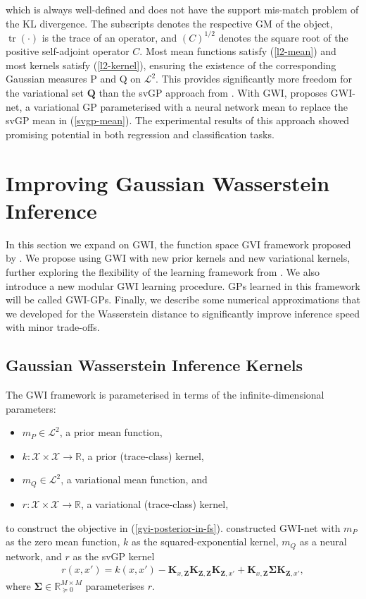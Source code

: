 \documentclass{article}
\newcommand{\tr}{\operatorname{tr}}
\numberwithin{equation}{section}
\begin{document}
which is always well-defined and does not have the support mis-match problem of the KL divergence.
The subscripts denotes the respective GM of the object, $\tr(\cdot)$ is the trace of an operator, and $(C)^{1/2}$ denotes the square root of the positive self-adjoint operator $C$.
Most mean functions satisfy (\ref{l2-mean}) and most kernels satisfy (\ref{l2-kernel}), ensuring the existence of the corresponding Gaussian measures P and Q on $\mathcal{L}^2$.
This provides significantly more freedom for the variational set $\boldsymbol{Q}$ than the svGP approach from \cite{titsias2009variational}.
With GWI, \cite{wild2022generalized} proposes GWI-net, a variational GP parameterised with a neural network mean to replace the svGP mean in (\ref{svgp-mean}).
The experimental results of this approach showed promising potential in both regression and classification tasks.

\newpage

\section{Improving Gaussian Wasserstein Inference}
In this section we expand on GWI, the function space GVI framework proposed by \cite{wild2022generalized}.
We propose using GWI with new prior kernels and new variational kernels, further exploring the flexibility of the learning framework from \cite{wild2022generalized}.
We also introduce a new modular GWI learning procedure.
GPs learned in this framework will be called GWI-GPs.
Finally, we describe some numerical approximations that we developed for the Wasserstein distance to significantly improve inference speed with minor trade-offs.

\subsection{Gaussian Wasserstein Inference Kernels}
The GWI framework is parameterised in terms of the infinite-dimensional parameters:
\begin{itemize}
    \item $m_P \in \mathcal{L}^2$, a prior mean function,
    \item $k: \mathcal{X} \times \mathcal{X} \rightarrow \mathbb{R}$, a prior (trace-class) kernel,
    \item $m_Q \in \mathcal{L}^2$, a variational mean function, and
    \item $r: \mathcal{X} \times \mathcal{X} \rightarrow \mathbb{R}$, a variational (trace-class) kernel,
\end{itemize}
to construct the objective in (\ref{gvi-posterior-in-fs}). \cite{wild2022generalized} constructed GWI-net with $m_P$ as the zero mean function, $k$ as the squared-exponential kernel, $m_Q$ as a neural network, and $r$ as the svGP kernel
\begin{align}
    r(x, x') = k(x, x') - \mathbf{K}_{x, \mathbf{Z}} \mathbf{K}_{\mathbf{Z}, \mathbf{Z}} \mathbf{K}_{\mathbf{Z}, x'} + \mathbf{K}_{x, \mathbf{Z}} \mathbf{\Sigma} \mathbf{K}_{\mathbf{Z}, x'},
    \label{gwi-svgp-kernel}
\end{align}
where $\mathbf{\Sigma} \in \mathbb{R}^{M \times M}_{\succcurlyeq 0}$ parameterises $r$.
\end{document}
